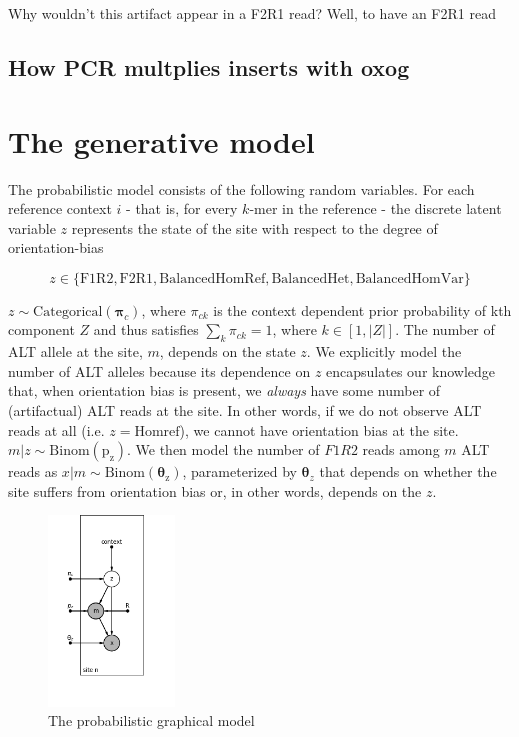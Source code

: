 \documentclass[a4paper]{article}
\newcommand{\vpi}{{\bm \pi}}
\newcommand{\vtheta}{{\bm \theta}}
\begin{document}
Why wouldn't this artifact appear in a F2R1 read? Well, to have an F2R1 read

\subsection{How PCR multplies inserts with oxog}


\section{The generative model}

The probabilistic model consists of the following random variables. For each reference context $i$ - that is, for every $k$-mer in the reference - the discrete latent variable $z$ represents the state of the site with respect to the degree of orientation-bias 

\begin{equation*}
z \in \{ \mathrm{F1R2}, \mathrm{F2R1}, \mathrm{Balanced Hom Ref}, \mathrm{ Balanced Het }, \mathrm{ Balanced Hom Var } \}
\end{equation*}

$z \sim \mathrm{Categorical}(\vpi_c)$, where $\pi_{ck}$ is the context dependent prior probability of kth component $Z$ and thus satisfies $\sum_k \pi_{ck} = 1$, where $k \in [1, |Z|]$. The number of ALT allele at the site, $m$, depends on the state $z$. We explicitly model the number of ALT alleles because its dependence on $z$ encapsulates our knowledge that, when orientation bias is present, we \textit{always} have some number of (artifactual) ALT reads at the site. In other words, if we do not observe ALT reads at all (i.e. $z = \mathrm{Hom ref}$), we cannot have orientation bias at the site. $m|z \sim \mathrm{Binom(p_z)}$. We then model the number of $F1R2$ reads among $m$ ALT reads as $x|m \sim \mathrm{Binom(\vtheta_z)}$, parameterized by $\vtheta_z$ that depends on whether the site suffers from orientation bias or, in other words, depends on the $z$. 

\begin{figure}
\centering
\includegraphics[width=0.3\textwidth]{pgm.png}
\caption{\label{fig:pgm} The probabilistic graphical model}
\end{figure}
\end{document}
